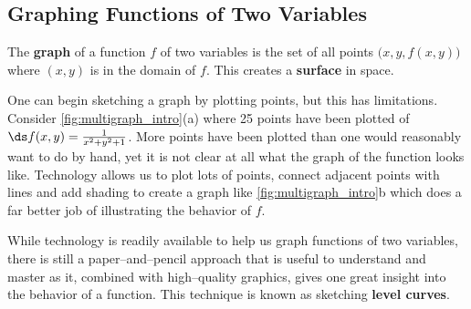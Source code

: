 \subsection*{Graphing Functions of Two Variables}


The \textbf{graph} of a function $f$ of two variables is the set of all points $\big(x,y,f(x,y)\big)$ where $(x,y)$ is in the domain of $f$. This creates a \textbf{surface} in space.

One can begin sketching a graph by plotting points, but this has limitations. Consider \autoref{fig:multigraph_intro}(a) where 25 points have been plotted of $\ds f(x,y) = \frac1{x^2+y^2+1}$. More points have been plotted than one would reasonably want to do by hand, yet it is not clear at all what the graph of the function looks like. Technology allows us to plot lots of points, connect adjacent points with lines and add shading to create a graph like \autoref{fig:multigraph_intro}b which does a far better job of illustrating the behavior of $f$.

While technology is readily available to help us graph functions of two variables, there is still a paper--and--pencil approach that is useful to understand and master as it, combined with high--quality graphics, gives one great insight into the behavior of a function. This technique is known as sketching \textbf{level curves}.

